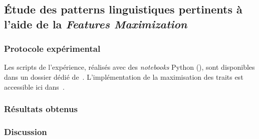 	\subsection{Étude des patterns linguistiques pertinents à l'aide de la \textit{Features Maximization}}
	\label{section:4.4.2-ETUDE-PERTINENCE-PATTERNS-LINGUISTIQUES}
		
	
		\subsubsection{Protocole expérimental}
			
			\begin{leftBarInformation}
				Les scripts de l'expérience, réalisés avec des \textit{notebooks} Python (\cite{van-rossum-drake:2009:python-reference-manual}), sont disponibles dans un dossier dédié de~\cite{schild:2021:cognitivefactory-interactiveclusteringcomparativestudy}.
				L'implémentation de la maximisation des traits est accessible ici dans~\cite{schild:2023:cognitivefactory-featuresmaximizationmetric}.
			\end{leftBarInformation}

		\subsubsection{Résultats obtenus}
		
			

		\subsubsection{Discussion}
		
			
			
	
	
	
